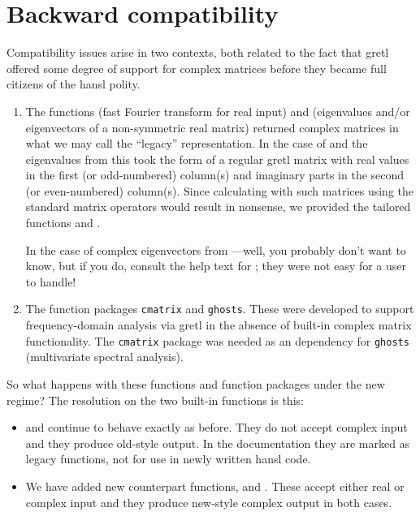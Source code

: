 \section{Backward compatibility}
\label{sec:cmplx-compat}

Compatibility issues arise in two contexts, both related to the fact
that gretl offered some degree of support for complex matrices before
they became full citizens of the hansl polity.

\begin{enumerate}
\item The functions  (fast Fourier transform for real
  input) and  (eigenvalues and/or eigenvectors of a
  non-symmetric real matrix) returned complex matrices in what we may
  call the ``legacy'' representation. In the case of  and
  the eigenvalues from  this took the form of a
  regular gretl matrix with real values in the first (or odd-numbered)
  column(s) and imaginary parts in the second (or even-numbered)
  column(s). Since calculating with such matrices using the standard
  matrix operators would result in nonsense, we provided the tailored
  functions  and .

  In the case of complex eigenvectors from ---well,
  you probably don't want to know, but if you do, consult the help text
  for ; they were not easy for a user to handle!
\item The function packages \texttt{cmatrix} and
  \texttt{ghosts}. These were developed to support frequency-domain
  analysis via gretl in the absence of built-in complex matrix
  functionality. The \texttt{cmatrix} package was needed as an
  dependency for \texttt{ghosts} (multivariate spectral analysis).
\end{enumerate}

So what happens with these functions and function packages under the
new regime? The resolution on the two built-in functions is this:
\begin{itemize}
\item {} and  continue to behave exactly as
  before. They do not accept complex input and they produce old-style
  output. In the documentation they are marked as legacy functions,
  not for use in newly written hansl code.
\item We have added new counterpart functions,  and
  . These accept either real or complex input and they
  produce new-style complex output in both cases.
\end{itemize}


